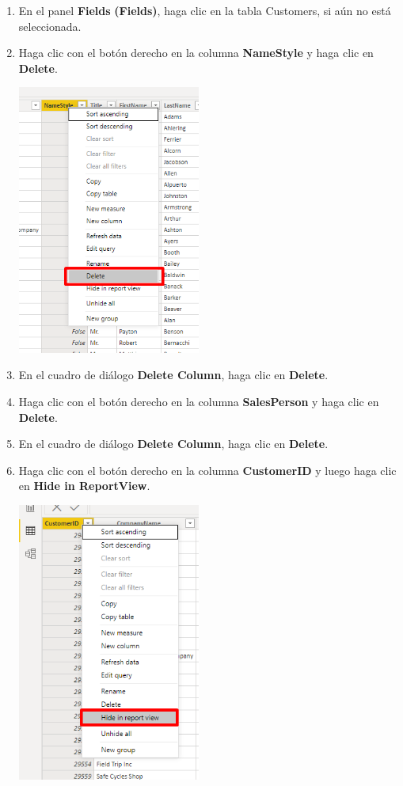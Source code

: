 \documentclass[12pt,letterpaper]{article}
\newcommand\tab[1][1cm]{\hspace*{#1}}
\begin{document}
\begin{enumerate}[\tab 1.]
\begin{center}
        \end{center}
        \item En el panel \textbf{Fields} \textbf{(Fields)}, haga clic en la tabla Customers, si aún no está seleccionada.
        \item Haga clic con el botón derecho en la columna \textbf{NameStyle} y haga clic en \textbf{Delete}.
        \begin{center}
            \includegraphics[width=6cm]{./img/img19.png}
        \end{center}
        \item En el cuadro de diálogo \textbf{Delete Column}, haga clic en \textbf{Delete}.
        \item Haga clic con el botón derecho en la columna \textbf{SalesPerson} y haga clic en \textbf{Delete}.
        \item En el cuadro de diálogo \textbf{Delete Column}, haga clic en \textbf{Delete}.
        \item Haga clic con el botón derecho en la columna \textbf{CustomerID} y luego haga clic en \textbf{Hide in ReportView}.
        \begin{center}
            \includegraphics[width=6cm]{./img/img23.png}

\end{center}
\end{enumerate}
\end{document}
